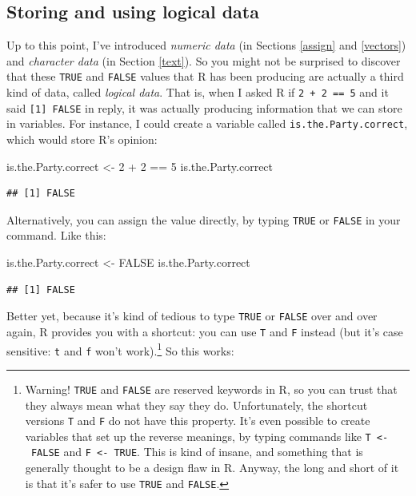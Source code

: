 \documentclass[
]{book}
\newenvironment{Shaded}{\begin{snugshade}}{\end{snugshade}}
\newcommand{\ConstantTok}[1]{\textcolor[rgb]{0.00,0.00,0.00}{#1}}
\newcommand{\DecValTok}[1]{\textcolor[rgb]{0.00,0.00,0.81}{#1}}
\newcommand{\NormalTok}[1]{#1}
\newcommand{\OtherTok}[1]{\textcolor[rgb]{0.56,0.35,0.01}{#1}}
\newcommand{\SpecialCharTok}[1]{\textcolor[rgb]{0.00,0.00,0.00}{#1}}
\begin{document}
\hypertarget{storing-and-using-logical-data}{%
\subsection{Storing and using logical data}\label{storing-and-using-logical-data}}

Up to this point, I've introduced \emph{numeric data} (in Sections \ref{assign} and \ref{vectors}) and \emph{character data} (in Section \ref{text}). So you might not be surprised to discover that these \texttt{TRUE} and \texttt{FALSE} values that R has been producing are actually a third kind of data, called \emph{logical data}. That is, when I asked R if \texttt{2\ +\ 2\ ==\ 5} and it said \texttt{{[}1{]}\ FALSE} in reply, it was actually producing information that we can store in variables. For instance, I could create a variable called \texttt{is.the.Party.correct}, which would store R's opinion:

\begin{Shaded}
\begin{Highlighting}[]
\NormalTok{is.the.Party.correct }\OtherTok{\textless{}{-}} \DecValTok{2} \SpecialCharTok{+} \DecValTok{2} \SpecialCharTok{==} \DecValTok{5}
\NormalTok{is.the.Party.correct}
\end{Highlighting}
\end{Shaded}

\begin{verbatim}
## [1] FALSE
\end{verbatim}

Alternatively, you can assign the value directly, by typing \texttt{TRUE} or \texttt{FALSE} in your command. Like this:

\begin{Shaded}
\begin{Highlighting}[]
\NormalTok{is.the.Party.correct }\OtherTok{\textless{}{-}} \ConstantTok{FALSE}
\NormalTok{is.the.Party.correct}
\end{Highlighting}
\end{Shaded}

\begin{verbatim}
## [1] FALSE
\end{verbatim}

Better yet, because it's kind of tedious to type \texttt{TRUE} or \texttt{FALSE} over and over again, R provides you with a shortcut: you can use \texttt{T} and \texttt{F} instead (but it's case sensitive: \texttt{t} and \texttt{f} won't work).\footnote{Warning! \texttt{TRUE} and \texttt{FALSE} are reserved keywords in R, so you can trust that they always mean what they say they do. Unfortunately, the shortcut versions \texttt{T} and \texttt{F} do not have this property. It's even possible to create variables that set up the reverse meanings, by typing commands like \texttt{T\ \textless{}-\ FALSE} and \texttt{F\ \textless{}-\ TRUE}. This is kind of insane, and something that is generally thought to be a design flaw in R. Anyway, the long and short of it is that it's safer to use \texttt{TRUE} and \texttt{FALSE}.} So this works:
\end{document}

